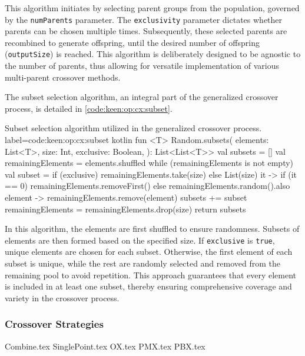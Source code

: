         This algorithm initiates by selecting parent groups from the population, governed by the \texttt{numParents} 
        parameter. The \texttt{exclusivity} parameter dictates whether parents can be chosen multiple times. 
        Subsequently, these selected parents are recombined to generate offspring, until the desired number of offspring 
        (\texttt{outputSize}) is reached. This algorithm is deliberately designed to be agnostic to the number of 
        parents, thus allowing for versatile implementation of various multi-parent crossover methods.

        The subset selection algorithm, an integral part of the generalized crossover process, is detailed in 
        \vref{code:keen:op:cx:subset}.

        \begin{code}{
            Subset selection algorithm utilized in the generalized crossover process.
        }{
            label=code:keen:op:cx:subset
        }{kotlin}
            fun <T> Random.subsets(
                elements: List<T>,
                size: Int,
                exclusive: Boolean,
            ): List<List<T>> {
                val subsets = []
                val remainingElements = elements.shuffled
                while (remainingElements is not empty) {
                    val subset = if (exclusive) {
                        remainingElements.take(size)
                    } else {
                        List(size) { it ->
                            if (it == 0) remainingElements.removeFirst()
                            else remainingElements.random().also { 
                                element -> remainingElements.remove(element) 
                            }
                        }
                    }
                    subsets += subset
                    remainingElements = remainingElements.drop(size)
                }
                return subsets
            }
        \end{code}

        In this algorithm, the elements are first shuffled to ensure randomness. Subsets of elements are then formed 
        based on the specified size. If \texttt{exclusive} is \texttt{true}, unique elements are chosen for each subset. 
        Otherwise, the first element of each subset is unique, while the rest are randomly selected and removed from the 
        remaining pool to avoid repetition. This approach guarantees that every element is included in at least one 
        subset, thereby ensuring comprehensive coverage and variety in the crossover process.

    \subsubsection{Crossover Strategies}
    {Combine.tex}
    {SinglePoint.tex}
    {OX.tex}
    {PMX.tex}
    {PBX.tex}
  